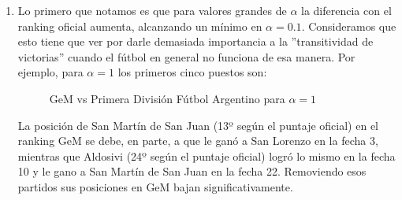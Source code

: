 \begin{enumerate}[parsep=1ex]
    \item Lo primero que notamos es que para valores grandes de $\alpha$ la
        diferencia con el ranking oficial aumenta, alcanzando un mínimo en
        $\alpha=0.1$. Consideramos que esto tiene que ver por darle demasiada
        importancia a la ''transitividad de victorias'' cuando el fútbol en
        general no funciona de esa manera. Por ejemplo, para $\alpha=1$ los
        primeros cinco puestos son:

        \begin{figure}[H]
            \centering
            \hspace{10pt}
            \caption{GeM vs Primera Divisi\'on F\'utbol Argentino para $\alpha=1$}
            \label{fig:exp6_arg_1}
        \end{figure}

        \par La posición de San Martín de San Juan (13º según el puntaje
        oficial) en el ranking GeM se debe, en parte, a que le ganó a San
        Lorenzo en la fecha 3, mientras que Aldosivi (24º según el puntaje
        oficial) logró lo mismo en la fecha 10 y le gano a San Martín de San
        Juan en la fecha 22. Removiendo esos partidos sus posiciones en GeM
        bajan significativamente.


\end{enumerate}
